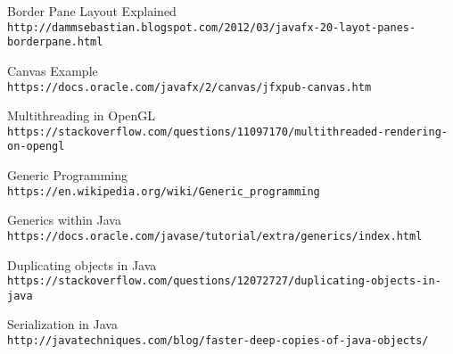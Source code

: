 \documentclass[../../main.tex]{subfiles}
\begin{document}
\begin{thebibliography}{9}
Border Pane Layout Explained\\
\texttt{http://dammsebastian.blogspot.com/2012/03/javafx-20-layot-panes-borderpane.html}

Canvas Example\\
\texttt{https://docs.oracle.com/javafx/2/canvas/jfxpub-canvas.htm}

Multithreading in OpenGL\\
\texttt{https://stackoverflow.com/questions/11097170/multithreaded-rendering-on-opengl}

Generic Programming\\
\texttt{https://en.wikipedia.org/wiki/Generic\_programming}

Generics within Java\\
\texttt{https://docs.oracle.com/javase/tutorial/extra/generics/index.html}

Duplicating objects in Java\\
\texttt{https://stackoverflow.com/questions/12072727/duplicating-objects-in-java}

Serialization in Java\\
\texttt{http://javatechniques.com/blog/faster-deep-copies-of-java-objects/}

\end{thebibliography}
\end{document}
